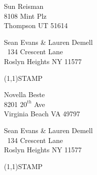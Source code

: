 \documentclass[12pt]{article}
\begin{document}
\begin{center} \begin{Huge} \vspace*{\fill}
Sun Reisman\\
8108 Mint Plz\\
Thompson UT 51614\\
\vspace{\fill} \end{Huge} \end{center}

\clearpage

\begin{minipage}{.5\linewidth} \noindent
Sean Evans \& Lauren Demell\\\ 
134 Crescent Lane\\ 
Roslyn Heights NY 11577
\end{minipage}
\begin{minipage}{.5\linewidth \hspace{-.2in} \vspace{-.3in}}
\begin{flushright}
\framebox(1,1){STAMP}
\end{flushright}
\end{minipage}

\begin{center} \begin{Huge} \vspace*{\fill}
Novella Beste\\
8201 $20^{th}$ Ave\\
Virginia Beach VA 49797\\
\vspace{\fill} \end{Huge} \end{center}

\clearpage

\begin{minipage}{.5\linewidth} \noindent
Sean Evans \& Lauren Demell\\\ 
134 Crescent Lane\\ 
Roslyn Heights NY 11577
\end{minipage}
\begin{minipage}{.5\linewidth \hspace{-.2in} \vspace{-.3in}}
\begin{flushright}
\framebox(1,1){STAMP}
\end{flushright}
\end{minipage}
\end{document}

